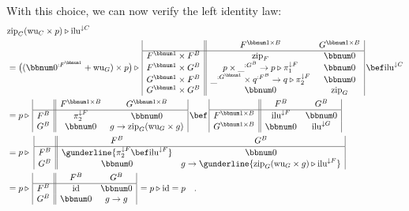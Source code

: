 With this choice, we can now verify the left identity law:
\begin{align*}
 & \text{zip}_{C}(\text{wu}_{C}\times p)\triangleright\text{ilu}^{\downarrow C}\\
 & =\big((\bbnum 0^{:F^{\bbnum 1}}+\text{wu}_{G})\times p\big)\triangleright\,\begin{array}{|c||cc|}
 & F^{\bbnum 1\times B} & G^{\bbnum 1\times B}\\
\hline F^{\bbnum 1}\times F^{B} & \text{zip}_{F} & \bbnum 0\\
F^{\bbnum 1}\times G^{B} & p\times\_^{:G^{B}}\rightarrow p\triangleright\pi_{1}^{\downarrow F} & \bbnum 0\\
G^{\bbnum 1}\times F^{B} & \_^{:G^{\bbnum 1}}\times q^{:F^{B}}\rightarrow q\triangleright\pi_{2}^{\downarrow F} & \bbnum 0\\
G^{\bbnum 1}\times G^{B} & \bbnum 0 & \text{zip}_{G}
\end{array}\,\bef\text{ilu}^{\downarrow C}\\
 & =p\triangleright\,\begin{array}{|c||cc|}
 & F^{\bbnum 1\times B} & G^{\bbnum 1\times B}\\
\hline F^{B} & \pi_{2}^{\downarrow F} & \bbnum 0\\
G^{B} & \bbnum 0 & g\rightarrow\text{zip}_{G}(\text{wu}_{G}\times g)
\end{array}\,\bef\,\begin{array}{|c||cc|}
 & F^{B} & G^{B}\\
\hline F^{\bbnum 1\times B} & \text{ilu}^{\downarrow F} & \bbnum 0\\
G^{\bbnum 1\times B} & \bbnum 0 & \text{ilu}^{\downarrow G}
\end{array}\\
 & =p\triangleright\,\,\begin{array}{|c||cc|}
 & F^{B} & G^{B}\\
\hline F^{B} & \gunderline{\pi_{2}^{\downarrow F}\bef\text{ilu}^{\downarrow F}} & \bbnum 0\\
G^{B} & \bbnum 0 & g\rightarrow\gunderline{\text{zip}_{G}(\text{wu}_{G}\times g)\triangleright\text{ilu}^{\downarrow F}}
\end{array}\\
 & =p\triangleright\,\begin{array}{|c||cc|}
 & F^{B} & G^{B}\\
\hline F^{B} & \text{id} & \bbnum 0\\
G^{B} & \bbnum 0 & g\rightarrow g
\end{array}\,=p\triangleright\text{id}=p\quad.
\end{align*}

